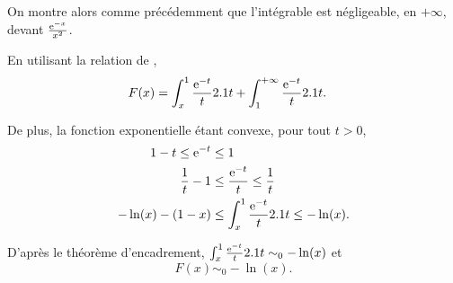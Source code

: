 \begin{elemsolution}
\begin{reponses}
On montre alors comme précédemment que l'intégrable est négligeable, en $+\infty$, devant $\frac{\mathrm{e}^{-x}}{x^2}$.

\item En utilisant la relation de ,
\begin{align*}
F(x)
&= \int_x^1 \frac{\mathrm{e}^{-t}}{t} 2.1 t + \int_1^{+\infty} \frac{\mathrm{e}^{-t}}{t} 2.1 t.
\end{align*}

De plus, la fonction exponentielle étant convexe, pour tout $t > 0$,
\begin{align*}
1 - t \leq \mathrm{e}^{-t} &\leq 1\\
\frac{1}{t} - 1 &\leq \frac{\mathrm{e}^{-t}}{t} \leq \frac{1}{t}\\
-\ln(x) - (1 - x) &\leq \int_x^1 \frac{\mathrm{e}^{-t}}{t} 2.1 t \leq -\ln(x).
\end{align*}

D'après le théorème d'encadrement, $\int_x^1 \frac{\mathrm{e}^{-t}}{t} 2.1 t \sim_0 -\ln(x)$ et
\[
F(x) \sim_0 -\ln(x).
\]
\end{reponses}
\end{elemsolution}